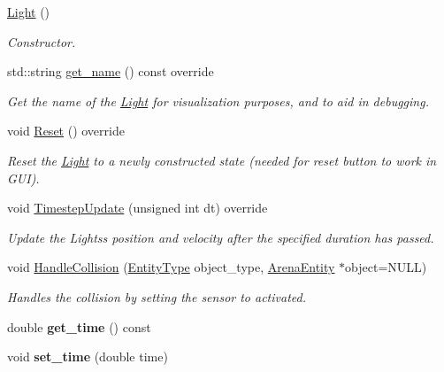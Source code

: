 \begin{DoxyCompactItemize}
\item 
\hyperlink{classLight_aeb5df09a25a32f19fdffa761268ba24f}{Light} ()\hypertarget{classLight_aeb5df09a25a32f19fdffa761268ba24f}{}\label{classLight_aeb5df09a25a32f19fdffa761268ba24f}

\begin{DoxyCompactList}\small\item\em Constructor. \end{DoxyCompactList}\item 
std\+::string \hyperlink{classLight_a49b2e32cf8173353ac4689fdadbb95d5}{get\+\_\+name} () const override\hypertarget{classLight_a49b2e32cf8173353ac4689fdadbb95d5}{}\label{classLight_a49b2e32cf8173353ac4689fdadbb95d5}

\begin{DoxyCompactList}\small\item\em Get the name of the \hyperlink{classLight}{Light} for visualization purposes, and to aid in debugging. \end{DoxyCompactList}\item 
void \hyperlink{classLight_a61485eb0684868b503e1b96e6a3206c3}{Reset} () override\hypertarget{classLight_a61485eb0684868b503e1b96e6a3206c3}{}\label{classLight_a61485eb0684868b503e1b96e6a3206c3}

\begin{DoxyCompactList}\small\item\em Reset the \hyperlink{classLight}{Light} to a newly constructed state (needed for reset button to work in G\+UI). \end{DoxyCompactList}\item 
void \hyperlink{classLight_a97934eec7489f9b072534f5e30a2d90d}{Timestep\+Update} (unsigned int dt) override
\begin{DoxyCompactList}\small\item\em Update the Lights\textquotesingle{}s position and velocity after the specified duration has passed. \end{DoxyCompactList}\item 
void \hyperlink{classLight_a7b8ef784bba9ec5725b0b0595e7da850}{Handle\+Collision} (\hyperlink{entity__type_8h_ad79a57ed3105eb60d991a1aeb4a9dc44}{Entity\+Type} object\+\_\+type, \hyperlink{classArenaEntity}{Arena\+Entity} $\ast$object=N\+U\+LL)\hypertarget{classLight_a7b8ef784bba9ec5725b0b0595e7da850}{}\label{classLight_a7b8ef784bba9ec5725b0b0595e7da850}

\begin{DoxyCompactList}\small\item\em Handles the collision by setting the sensor to activated. \end{DoxyCompactList}\item 
double {\bfseries get\+\_\+time} () const \hypertarget{classLight_a8715f4e6099886efcc8445a15238bc5d}{}\label{classLight_a8715f4e6099886efcc8445a15238bc5d}

\item 
void {\bfseries set\+\_\+time} (double time)\hypertarget{classLight_a89407e87b4f9d1ae7424c223a1c05268}{}\label{classLight_a89407e87b4f9d1ae7424c223a1c05268}

\end{DoxyCompactItemize}
